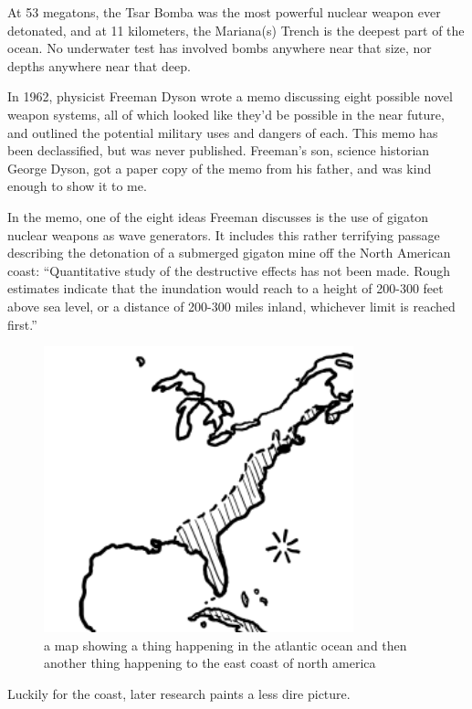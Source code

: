{At 53 megatons, the Tsar Bomba was the most powerful nuclear weapon ever detonated, and at 11 kilometers, the Mariana(s) Trench is the deepest part of the ocean. No underwater test has involved bombs anywhere near that size, nor depths anywhere near that deep.}

{In 1962, physicist Freeman Dyson wrote a memo discussing eight possible novel weapon systems, all of which looked like they’d be possible in the near future, and outlined the potential military uses and dangers of each. This memo has been declassified, but was never published. Freeman’s son, science historian George Dyson, got a paper copy of the memo from his father, and was kind enough to show it to me.}

{In the memo, one of the eight ideas Freeman discusses is the use of gigaton nuclear weapons as wave generators. It includes this rather terrifying passage describing the detonation of a submerged gigaton mine off the North American coast: “Quantitative study of the destructive effects has not been made. Rough estimates indicate that the inundation would reach to a height of 200-300 feet above sea level, or a distance of 200-300 miles inland, whichever limit is reached first.”}

\begin{figure}[!htbp]
\centering
\includegraphics[scale=0.5, max width=0.8\textwidth]{imgs/a/15/mariana_map.png}
\caption{a map showing a thing happening in the atlantic ocean and then another thing happening to the east coast of north america}
\end{figure}

{Luckily for the coast, later research paints a less dire picture.}

